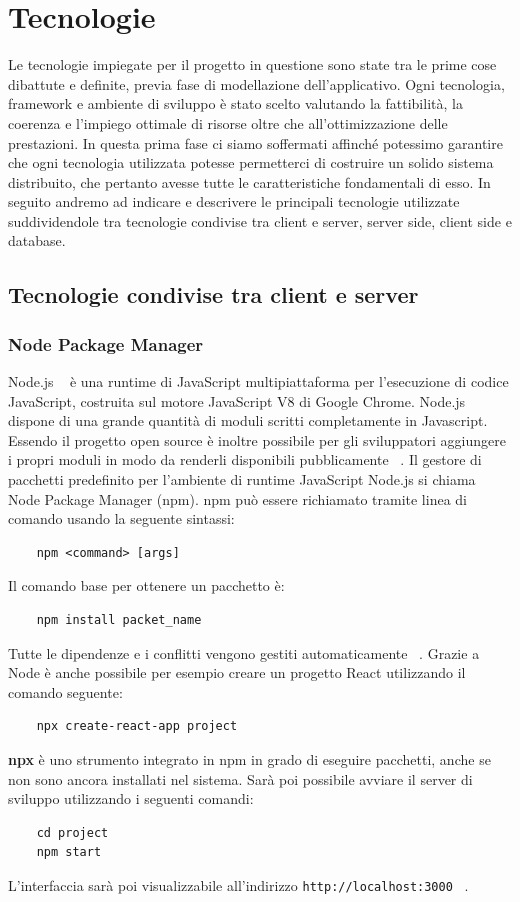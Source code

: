 \chapter{Tecnologie}
Le tecnologie impiegate per il progetto in questione sono state tra le prime cose dibattute e definite, previa fase di modellazione dell'applicativo. Ogni tecnologia, framework e ambiente di sviluppo è stato scelto valutando la fattibilità, la coerenza e l'impiego ottimale di risorse oltre che all'ottimizzazione delle prestazioni. In questa prima fase ci siamo soffermati affinché potessimo garantire che ogni tecnologia utilizzata potesse permetterci di costruire un solido sistema distribuito, che pertanto avesse tutte le caratteristiche fondamentali di esso. In seguito andremo ad indicare e descrivere le principali tecnologie utilizzate suddividendole tra tecnologie condivise tra client e server, server side, client side e database.

\section{Tecnologie condivise tra client e server}
\subsection{Node Package Manager}
\noindent Node.js ~\cite{nodejs:online} è una runtime di JavaScript multipiattaforma per l'esecuzione di codice JavaScript, costruita sul motore JavaScript V8 di Google Chrome.\newline
Node.js dispone di una grande quantità di moduli scritti completamente in Javascript.
Essendo il progetto open source è inoltre possibile per gli sviluppatori aggiungere i propri moduli in modo da renderli disponibili pubblicamente ~\cite{nodejs:online}.\newline 
\noindent Il gestore di pacchetti predefinito per l'ambiente di runtime JavaScript Node.js si chiama Node Package Manager (npm).
npm può essere richiamato tramite linea di comando usando la seguente sintassi:
\begin{verbatim}
    npm <command> [args]
\end{verbatim}
Il comando base per ottenere un pacchetto è:
\begin{verbatim}
    npm install packet_name
\end{verbatim}
Tutte le dipendenze e i conflitti vengono gestiti automaticamente ~\cite{npmDo:online}.
\newline Grazie a Node è anche possibile per esempio creare un progetto React utilizzando il comando seguente:
\begin{verbatim}
    npx create-react-app project
\end{verbatim}
\textbf{npx} è uno strumento integrato in npm in grado di eseguire pacchetti, anche se non sono ancora installati nel sistema.\newline
Sarà poi possibile avviare il server di sviluppo utilizzando i seguenti comandi:
\begin{verbatim}
    cd project
    npm start
\end{verbatim}
L'interfaccia sarà poi visualizzabile all'indirizzo \texttt{http://localhost:3000} ~\cite{PrimiPas97:online}.

